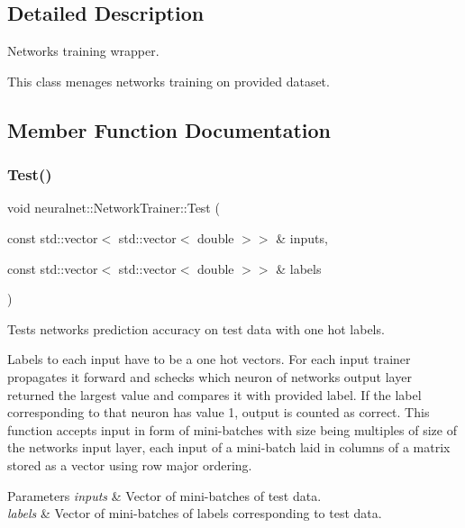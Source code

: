 \subsection{Detailed Description}
Network\textquotesingle{}s training wrapper. 

This class menages network\textquotesingle{}s training on provided dataset. 

\subsection{Member Function Documentation}
\mbox{\label{classneuralnet_1_1NetworkTrainer_a41b19c85c1b35c36a8a1ee607857bf25}} 
\subsubsection{\texorpdfstring{Test()}{Test()}}
{\footnotesize\ttfamily void neuralnet\+::\+Network\+Trainer\+::\+Test (\begin{DoxyParamCaption}\item[{const std\+::vector$<$ std\+::vector$<$ double $>$$>$ \&}]{inputs,  }\item[{const std\+::vector$<$ std\+::vector$<$ double $>$$>$ \&}]{labels }\end{DoxyParamCaption})\hspace{0.3cm}{\ttfamily [virtual]}}



Tests network\textquotesingle{}s prediction accuracy on test data with \textquotesingle{}one hot\textquotesingle{} labels. 

Labels to each input have to be a \textquotesingle{}one hot\textquotesingle{} vectors. For each input trainer propagates it forward and schecks which neuron of network\textquotesingle{}s output layer returned the largest value and compares it with provided label. If the label corresponding to that neuron has value 1, output is counted as correct. This function accepts input in form of mini-\/batches with size being multiples of size of the network\textquotesingle{}s input layer, each input of a mini-\/batch laid in columns of a matrix stored as a vector using row major ordering.


\begin{DoxyParams}{Parameters}
{\em inputs} & Vector of mini-\/batches of test data. \\
\hline
{\em labels} & Vector of mini-\/batches of labels corresponding to test data. \\
\hline
\end{DoxyParams}
\mbox{\label{classneuralnet_1_1NetworkTrainer_a40f48d1edbe380ba8ef8e7782dbe7903}} 
